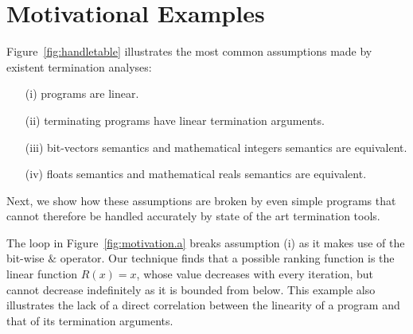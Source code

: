 \documentclass[preprint]{sigplanconf}
\theoremstyle{definition}
\begin{document}


\section{Motivational Examples} \label{sec:motivation}
Figure~\ref{fig:handletable} illustrates the most common assumptions made by existent termination analyses:
\begin{itemize}
\item[(i)] programs are linear.
\item[(ii)] terminating programs have linear termination arguments.
\item[(iii)] bit-vectors semantics and mathematical integers semantics are equivalent.
\item[(iv)] floats semantics and mathematical reals semantics are equivalent.
\end{itemize}  

Next, we show how these assumptions are broken by even simple programs that cannot therefore be handled accurately by state of the art termination tools.



The loop in Figure~\ref{fig:motivation.a} breaks assumption (i) as it makes use of the bit-wise $\&$ operator.
Our technique finds that a possible ranking function is the linear function
$R(x) = x$, whose value decreases with
every iteration, but cannot decrease indefinitely as it is bounded from below.
This example also illustrates the lack of a direct correlation between the linearity of a program and that of its termination arguments.
\end{document}
